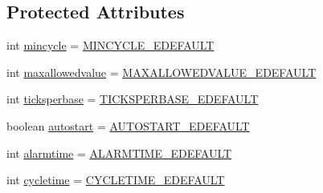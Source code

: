 \subsection*{Protected Attributes}
\begin{DoxyCompactItemize}
\item 
int \hyperlink{classshootingmachineemfmodel_1_1impl_1_1_alarm_impl_ae26a6934576aacef8b9aae1e6c6a3010}{mincycle} = \hyperlink{classshootingmachineemfmodel_1_1impl_1_1_alarm_impl_a292caf682730a300a1517d0a42910743}{M\-I\-N\-C\-Y\-C\-L\-E\-\_\-\-E\-D\-E\-F\-A\-U\-L\-T}
\item 
int \hyperlink{classshootingmachineemfmodel_1_1impl_1_1_alarm_impl_a63897cf99fd1eba61bc5fd9aa6d168ca}{maxallowedvalue} = \hyperlink{classshootingmachineemfmodel_1_1impl_1_1_alarm_impl_af80742cf00da4bbdb1a55441e3e18835}{M\-A\-X\-A\-L\-L\-O\-W\-E\-D\-V\-A\-L\-U\-E\-\_\-\-E\-D\-E\-F\-A\-U\-L\-T}
\item 
int \hyperlink{classshootingmachineemfmodel_1_1impl_1_1_alarm_impl_ab4ed313bc24457b3837532824d660c94}{ticksperbase} = \hyperlink{classshootingmachineemfmodel_1_1impl_1_1_alarm_impl_a3c3b372b88aaa3f67b535965a8c3262a}{T\-I\-C\-K\-S\-P\-E\-R\-B\-A\-S\-E\-\_\-\-E\-D\-E\-F\-A\-U\-L\-T}
\item 
boolean \hyperlink{classshootingmachineemfmodel_1_1impl_1_1_alarm_impl_afc1bb0e74f4c4da81e00d2263997fb2f}{autostart} = \hyperlink{classshootingmachineemfmodel_1_1impl_1_1_alarm_impl_ae3645bdaa1939ee466b393bec08d2ad3}{A\-U\-T\-O\-S\-T\-A\-R\-T\-\_\-\-E\-D\-E\-F\-A\-U\-L\-T}
\item 
int \hyperlink{classshootingmachineemfmodel_1_1impl_1_1_alarm_impl_aabc3718d53d5050412741b48266549fb}{alarmtime} = \hyperlink{classshootingmachineemfmodel_1_1impl_1_1_alarm_impl_ab1311546de8d5b8a4a39f776185907f8}{A\-L\-A\-R\-M\-T\-I\-M\-E\-\_\-\-E\-D\-E\-F\-A\-U\-L\-T}
\item 
int \hyperlink{classshootingmachineemfmodel_1_1impl_1_1_alarm_impl_a46d6e8977ebf62cb1750a0ae81d7cf1e}{cycletime} = \hyperlink{classshootingmachineemfmodel_1_1impl_1_1_alarm_impl_a8014dd85bb93f14eda34c8ba7fd6e572}{C\-Y\-C\-L\-E\-T\-I\-M\-E\-\_\-\-E\-D\-E\-F\-A\-U\-L\-T}
\end{DoxyCompactItemize}
